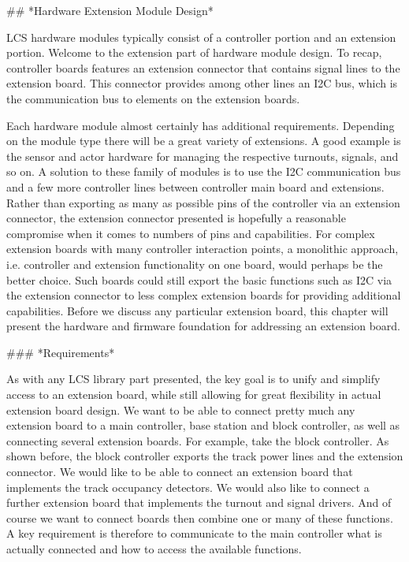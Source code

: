 ## *Hardware Extension Module Design*

LCS hardware modules typically consist of a controller portion and an extension portion. Welcome to the extension part of hardware module design. To recap, controller boards features an extension connector that contains signal lines to the extension board. This connector provides among other lines an I2C bus, which is the communication bus to elements on the extension boards.

Each hardware module almost certainly has additional requirements. Depending on the module type there will be a great variety of extensions. A good example is the sensor and actor hardware for managing the respective turnouts, signals, and so on. A solution to these family of modules is to use the I2C communication bus and a few more controller lines between controller main board and extensions. Rather than exporting as many as possible pins of the controller via an extension connector, the extension connector presented is hopefully a reasonable compromise when it comes to numbers of pins and capabilities. For complex extension boards with many controller interaction points, a monolithic approach, i.e. controller and extension functionality on one board, would perhaps be the better choice. Such boards could still export the basic functions such as I2C via the extension connector to less complex extension boards for providing additional capabilities. Before we discuss any particular extension board, this chapter will present the hardware and firmware foundation for addressing an extension board.

### *Requirements*

As with any LCS library part presented, the key goal is to unify and simplify access to an extension board, while still allowing for great flexibility in actual extension board design. We want to be able to connect pretty much any extension board to a main controller, base station and block controller, as well as connecting several extension boards. For example, take the block controller. As shown before, the block controller exports the track power lines and the extension connector. We would like to be able to connect an extension board that implements the track occupancy detectors. We would also like to connect a further extension board that implements the turnout and signal drivers. And of course we want to connect boards then combine one or many of these functions. A key requirement is therefore to communicate to the main controller what is actually connected and how to access the available functions.

